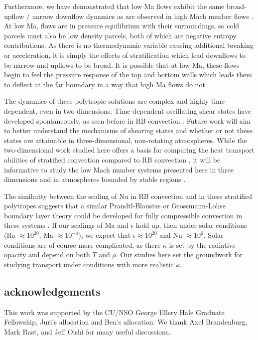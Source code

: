 \documentclass[aps, prl, twocolumn, nofootinbib, groupedaddress, amsfonts, amssymb, amsmath]{revtex4-1}
\begin{document}
Furthermore, we have demonstrated that low Ma flows exhibit the same broad-upflow / narrow downflow dynamics
as are observed in high Mach number flows \cite{hurlburt&all1984}.  At low Ma, flows are in pressure equilibrium
with their surroundings, so cold parcels must also be low density parcels, both of which are negative
entropy contributions.  As there is no thermodynamic variable causing additional breaking or acceleration, it
is simply the effects of stratification which lead downflows to be narrow and upflows to be broad.
It is possible that at low Ma, these flows begin to feel the pressure response of the
top and bottom walls which leads them to deflect at the far boundary in a way that high Ma flows do not.

The dynamics of these polytropic solutions are complex and highly time-dependent, even in two dimensions.
Time-dependent oscillating shear states have developed spontaneously, as seen before in RB convection
\cite{goluskin&all2014}.  Future work will aim to better understand the mechanisms of shearing states and
whether or not these states are attainable in three-dimensional, non-rotating atmospheres.  While the
two-dimensional work studied here offers a basis for comparing the heat transport abilities of stratified
convection compared to RB convection \cite{johnston&doering2009}, it will be informative to study the low 
Mach number systems presented here in three dimensions and in atmospheres bounded by stable regions
\cite{hurlburt&all1986}.

The similarity between the scaling of Nu in RB convection and in these stratified polytropes suggests that
a similar Prandtl-Blausius or Grossmann-Lohse boundary layer theory could be developed for fully compressible
convection in these systems \cite{ahlers&all2009}.  If our scalings of Ma and $\epsilon$ hold up, then under
solar conditions (Ra $\approx 10^{20}$, Ma $\approx 10^{-4}$), we expect that $\epsilon \approx 10^{20}$ and
Nu $\approx 10^{6}$.  Solar conditions are of course more complicated, as there $\kappa$ is set by the
radiative opacity and depend on both $T$ and $\rho$.  Our studies here set the groundwork for studying transport
under conditions with more realistic $\kappa$.


\subsection{acknowledgements}
This work was supported by the CU/NSO George Ellery Hale Graduate Fellowship,
Juri's allocation and Ben's allocation.
We thank Axel Brandenburg, Mark Rast, and Jeff Oishi for many useful discussions.


\end{document}
